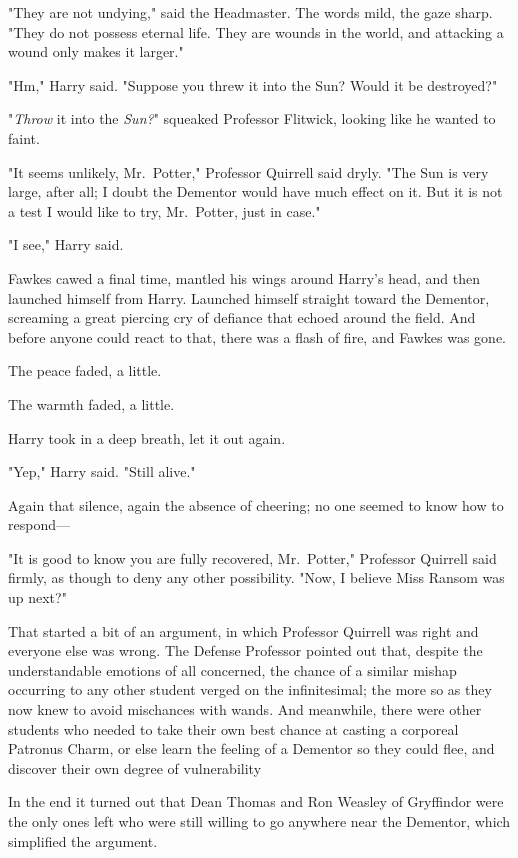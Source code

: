 "They are not undying," said the Headmaster. The words mild, the gaze sharp.
"They do not possess eternal life. They are wounds in the world, and attacking
a wound only makes it larger."

"Hm," Harry said. "Suppose you threw it into the Sun? Would it be destroyed?"

"\emph{Throw} it into the \emph{Sun?}" squeaked Professor Flitwick, looking
like he wanted to faint.

"It seems unlikely, Mr.~Potter," Professor Quirrell said dryly. "The Sun is
very large, after all; I doubt the Dementor would have much effect on it. But
it is not a test I would like to try, Mr.~Potter, just in case."

"I see," Harry said.

Fawkes cawed a final time, mantled his wings around Harry's head, and then
launched himself from Harry. Launched himself straight toward the Dementor,
screaming a great piercing cry of defiance that echoed around the field. And
before anyone could react to that, there was a flash of fire, and Fawkes was
gone.

The peace faded, a little.

The warmth faded, a little.

Harry took in a deep breath, let it out again.

"Yep," Harry said. "Still alive."

Again that silence, again the absence of cheering; no one seemed to know how to
respond—

"It is good to know you are fully recovered, Mr.~Potter," Professor Quirrell
said firmly, as though to deny any other possibility. "Now, I believe Miss
Ransom was up next?"

That started a bit of an argument, in which Professor Quirrell was right and
everyone else was wrong. The Defense Professor pointed out that, despite the
understandable emotions of all concerned, the chance of a similar mishap
occurring to any other student verged on the infinitesimal; the more so as they
now knew to avoid mischances with wands. And meanwhile, there were other
students who needed to take their own best chance at casting a corporeal
Patronus Charm, or else learn the feeling of a Dementor so they could flee, and
discover their own degree of vulnerability{\el}

In the end it turned out that Dean Thomas and Ron Weasley of Gryffindor were
the only ones left who were still willing to go anywhere near the Dementor,
which simplified the argument.

